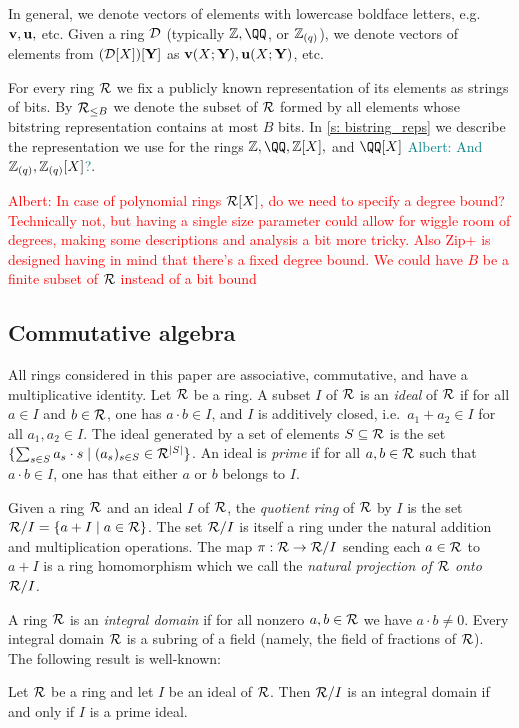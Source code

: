 \documentclass[11pt,letterpaper,usenames,dvipsnames]{article}
\newcommand{\albert}[1]{\textcolor{teal}{Albert: {#1}}}
\newcommand{\alberturgent}[1]{\textcolor{red}{Albert: {#1}}}
\begin{document}
In general, we denote vectors of elements with lowercase boldface letters, e.g.\ $\mathbf{v},\mathbf{u},$ etc. Given a ring $\mathcal{D}$ (typically $\ZZ, \QQ$, or $\mathbb{Z}_{(q)}$), we denote vectors of elements from $(\mathcal{D}[X])[\mathbf{Y}]$ as $\mathbf{v}(X;\mathbf{Y}), \mathbf{u}(X;\mathbf{Y})$, etc.


For every ring $\mathcal{R}$  we fix a publicly known representation of its elements as strings of bits. By $\mathcal{R}_{\leq B}$ we denote the subset of $\mathcal{R}$ formed by all elements whose bitstring representation contains at most $B$ bits. In \cref{s: bistring_reps} we describe the representation we use for the rings $\ZZ,\QQ, \ZZ[X],$ and $\QQ[X]$ \albert{And $\mathbb{Z}_{(q)},\mathbb{Z}_{(q)}[X]$?}.

\alberturgent{In case of polynomial rings $\mathcal{R}[X]$, do we need to specify a degree bound? Technically not, but having a single size parameter could allow for wiggle room of degrees, making some descriptions and analysis a bit more tricky. Also Zip+ is designed having in mind that there's a fixed degree bound. We could have $B$ be a finite subset of $\mathcal{R}$ instead of a bit bound}

\subsection{Commutative algebra}
All rings considered in this paper are associative, commutative, and have a multiplicative identity. Let $\mathcal{R}$ be a ring. A subset $I$ of $\mathcal{R}$ is an \emph{ideal} of $\mathcal{R}$ if for all $a\in I$ and $b\in \mathcal{R}$, one has $a\cdot b \in I$, and $I$ is additively closed, i.e.\ $a_1 + a_2 \in I$ for all $a_1, a_2\in I$. The ideal generated by a set of elements $S\subseteq \mathcal{R}$ is the set $\{\sum_{s\in S} a_s \cdot s \mid (a_s)_{s\in S}\in \mathcal{R}^{|S|}\}$. An ideal is \emph{prime} if for all $a,b\in \mathcal{R}$ such that $a\cdot b \in I$, one has that either $a$ or $b$ belongs to $I$. 

Given a ring $\mathcal{R}$ and an ideal $I$ of $\mathcal{R}$, the \emph{quotient ring} of $\mathcal{R}$ by $I$ is the set  $\mathcal{R}/I =\{a+I \mid a\in \mathcal{R}\}$. The set $\mathcal{R}/I$ is itself a ring under the natural addition and multiplication operations.  The map $\pi:\mathcal{R}\to \mathcal{R}/I$ sending each $a\in \mathcal{R}$ to $a+I$ is a ring homomorphism which we call the \emph{natural projection of $\mathcal{R}$ onto $\mathcal{R}/I$.}

A ring $\mathcal{R}$ is an \emph{integral domain} if for all nonzero $a,b\in \mathcal{R}$ we have $a\cdot b\neq 0$. Every integral domain $\mathcal{R}$ is a subring of a field (namely, the field of fractions of $\mathcal{R}$). The following result is well-known:
\begin{remark}\label{r: domain_prime}
Let $\mathcal{R}$ be a ring and let $I$  be an ideal of $\mathcal{R}$. Then $\mathcal{R}/I$ is an integral domain if and only if $I$ is a prime ideal.
\end{remark}
\end{document}

